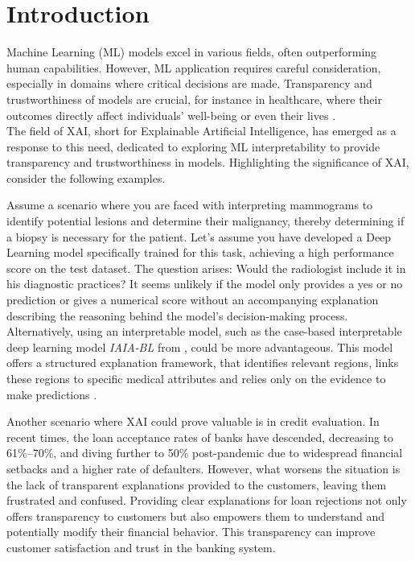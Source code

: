 
\section{Introduction}

Machine Learning (ML) models excel in various fields, often outperforming human capabilities. However, ML application requires careful consideration, especially in domains where critical decisions are made. Transparency and trustworthiness of models are crucial, for instance in healthcare, where their outcomes directly affect individuals' well-being or even their lives \cite{MARKUS2021103655}. \\
The field of XAI, short for Explainable Artificial Intelligence, has emerged as a response to this need, dedicated to exploring ML interpretability to provide transparency and trustworthiness in models. Highlighting the significance of XAI, consider the following examples.

Assume a scenario where you are faced with interpreting mammograms to identify potential lesions and determine their malignancy, thereby determining if a biopsy is necessary for the patient. Let's assume you have developed a Deep Learning model specifically trained for this task, achieving a high performance score on the test dataset.
The question arises: Would the radiologist include it in his diagnostic practices? It seems unlikely if the model only provides a yes or no prediction or gives a numerical score without an accompanying explanation describing the reasoning behind the model's decision-making process.
Alternatively, using an interpretable model, such as the case-based interpretable deep learning model \textit{IAIA-BL} from \cite{barnett2021case}, could be more advantageous. This model offers a structured explanation framework, that identifies relevant regions, links these regions to specific medical attributes and relies only on the evidence to make predictions \cite{barnett2021case}.

Another scenario where XAI could prove valuable is in credit evaluation. 
In recent times, the loan acceptance rates of banks have descended, decreasing to 61\%–70\%, and diving further to 50\% post-pandemic due to widespread financial setbacks and a higher rate of defaulters.
However, what worsens the situation is the lack of transparent explanations provided to the customers, leaving them frustrated and confused.
Providing clear explanations for loan rejections not only offers transparency to customers but also empowers them to understand and potentially modify their financial behavior. This transparency can improve customer satisfaction and trust in the banking system.
\cite{NALLAKARUPPAN2024111307}

